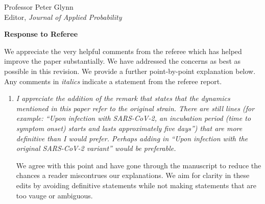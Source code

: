 \documentclass[11pt]{letter} %
\begin{document}

\begin{letter}{Professor
	Peter Glynn\\
	Editor, {\em Journal of Applied Probability}}



\signature{Walter Dempsey\\
University of Michigan\\
Department of Biostatistics\\
1415 Washington Heights\\
Ann Arbor, MI 48103} %


\vspace{5mm}

\newpage

{\bf Response to Referee}

We appreciate the very helpful comments from the referee which has helped improve the paper substantially. We have addressed the concerns as best as possible in this revision. We provide a further point-by-point explanation below. Any comments in {\it italics} indicate a statement from the referee report.
\begin{enumerate}
\item {\it I appreciate the addition of the remark that states that the dynamics mentioned in this paper refer to the original strain. There are still lines (for example: “Upon infection with SARS-CoV-2, an incubation period (time to symptom onset) starts and lasts approximately five days”) that are more definitive than I would prefer. Perhaps adding in “Upon infection with the original SARS-CoV-2 variant” would be preferable.}

\vspace{5mm}
We agree with this point and have gone through the manuscript to reduce the chances a reader miscontrues our explanations. We aim for clarity in these edits by avoiding definitive statements while not making statements that are too vauge or ambiguous.
\vspace{5mm}


\end{enumerate}
\end{letter}
\end{document}
